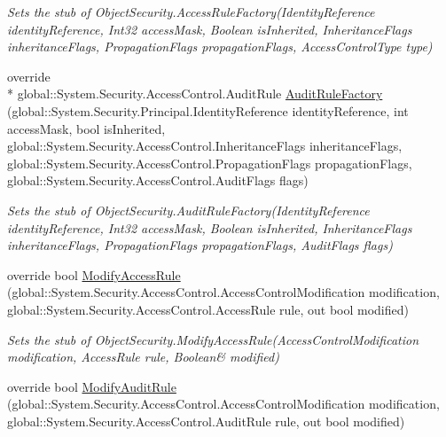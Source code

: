 \begin{DoxyCompactItemize}
\begin{DoxyCompactList}\small\item\em Sets the stub of Object\-Security.\-Access\-Rule\-Factory(\-Identity\-Reference identity\-Reference, Int32 access\-Mask, Boolean is\-Inherited, Inheritance\-Flags inheritance\-Flags, Propagation\-Flags propagation\-Flags, Access\-Control\-Type type)\end{DoxyCompactList}\item 
override \\*
global\-::\-System.\-Security.\-Access\-Control.\-Audit\-Rule \hyperlink{class_system_1_1_security_1_1_access_control_1_1_fakes_1_1_stub_native_object_security_a54a2d0b7f16de90bb041cd0440ccac6e}{Audit\-Rule\-Factory} (global\-::\-System.\-Security.\-Principal.\-Identity\-Reference identity\-Reference, int access\-Mask, bool is\-Inherited, global\-::\-System.\-Security.\-Access\-Control.\-Inheritance\-Flags inheritance\-Flags, global\-::\-System.\-Security.\-Access\-Control.\-Propagation\-Flags propagation\-Flags, global\-::\-System.\-Security.\-Access\-Control.\-Audit\-Flags flags)
\begin{DoxyCompactList}\small\item\em Sets the stub of Object\-Security.\-Audit\-Rule\-Factory(\-Identity\-Reference identity\-Reference, Int32 access\-Mask, Boolean is\-Inherited, Inheritance\-Flags inheritance\-Flags, Propagation\-Flags propagation\-Flags, Audit\-Flags flags)\end{DoxyCompactList}\item 
override bool \hyperlink{class_system_1_1_security_1_1_access_control_1_1_fakes_1_1_stub_native_object_security_a755bb66287023a8e2c552275d3be8973}{Modify\-Access\-Rule} (global\-::\-System.\-Security.\-Access\-Control.\-Access\-Control\-Modification modification, global\-::\-System.\-Security.\-Access\-Control.\-Access\-Rule rule, out bool modified)
\begin{DoxyCompactList}\small\item\em Sets the stub of Object\-Security.\-Modify\-Access\-Rule(Access\-Control\-Modification modification, Access\-Rule rule, Boolean\& modified)\end{DoxyCompactList}\item 
override bool \hyperlink{class_system_1_1_security_1_1_access_control_1_1_fakes_1_1_stub_native_object_security_a9fdb2e4907a72a20a05c6b0cdee34289}{Modify\-Audit\-Rule} (global\-::\-System.\-Security.\-Access\-Control.\-Access\-Control\-Modification modification, global\-::\-System.\-Security.\-Access\-Control.\-Audit\-Rule rule, out bool modified)

\end{DoxyCompactItemize}
